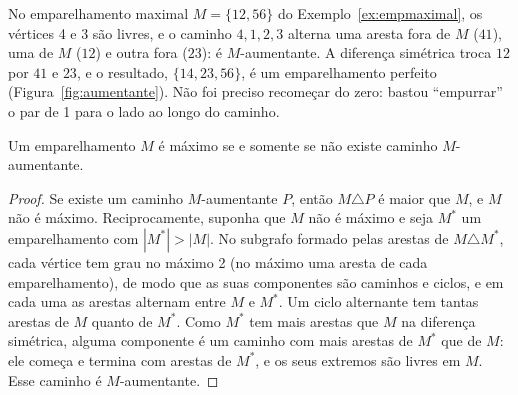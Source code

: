 \begin{exemplo}\label{ex:aumentante}
No emparelhamento maximal $M=\{12,56\}$ do Exemplo~\ref{ex:empmaximal}, os vértices 4 e 3 são livres, e o caminho $4,1,2,3$ alterna uma aresta fora de $M$ ($41$), uma de $M$ ($12$) e outra fora ($23$): é $M$-aumentante. A diferença simétrica troca $12$ por $41$ e $23$, e o resultado, $\{14,23,56\}$, é um emparelhamento perfeito (Figura~\ref{fig:aumentante}). Não foi preciso recomeçar do zero: bastou ``empurrar'' o par de 1 para o lado ao longo do caminho.
\begin{figura}[À esquerda, o caminho aumentante $4,1,2,3$ (em vermelho) em relação a $M=\{12,56\}$ (azul). À direita, $M\triangle P=\{14,23,56\}$: as arestas do caminho trocaram de papel.\label{fig:aumentante}]
\end{figura}
\end{exemplo}

\begin{teo}[Berge]\label{teo:berge}
Um emparelhamento $M$ é máximo se e somente se não existe caminho $M$-aumentante.
\end{teo}
\begin{proof}
Se existe um caminho $M$-aumentante $P$, então $M\triangle P$ é maior que $M$, e $M$ não é máximo. Reciprocamente, suponha que $M$ não é máximo e seja $M^*$ um emparelhamento com $|M^*|>|M|$. No subgrafo formado pelas arestas de $M\triangle M^*$, cada vértice tem grau no máximo 2 (no máximo uma aresta de cada emparelhamento), de modo que as suas componentes são caminhos e ciclos, e em cada uma as arestas alternam entre $M$ e $M^*$. Um ciclo alternante tem tantas arestas de $M$ quanto de $M^*$. Como $M^*$ tem mais arestas que $M$ na diferença simétrica, alguma componente é um caminho com mais arestas de $M^*$ que de $M$: ele começa e termina com arestas de $M^*$, e os seus extremos são livres em $M$. Esse caminho é $M$-aumentante.
\end{proof}


